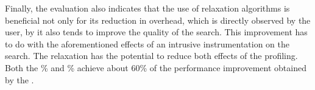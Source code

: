 Finally, the evaluation also indicates that the use of relaxation algorithms
is beneficial not only for its reduction in overhead, which is directly observed
by the user, by it also tends to improve the quality of the search.
This improvement has to do with the aforementioned effects of an intrusive
instrumentation on the search.
The relaxation has the potential to reduce both effects of the profiling.
Both the \% and \% achieve about 60\% of the
performance improvement obtained by the \OracleRM.
